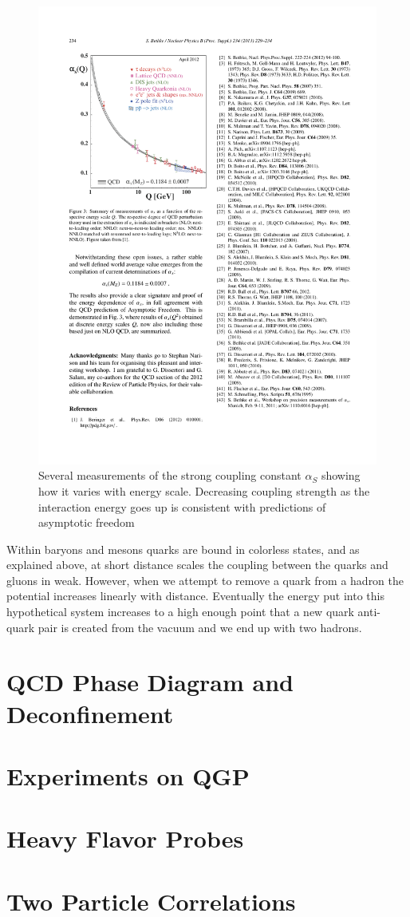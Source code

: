 \begin{figure}[htbp]
\begin{center}
\includegraphics[scale=1.0]{Plots/Intro/asymp_free.pdf}
\end{center}
\caption[Asymptotic Freedom]{Several measurements of the strong coupling constant $\alpha_S$ showing how it varies with energy scale. Decreasing coupling strength as the interaction energy goes up is consistent with predictions of asymptotic freedom}
\label{fig:a_free}
\end{figure}

Within baryons and mesons quarks are bound in colorless states, and as explained above, at short distance scales the coupling between the quarks and gluons in weak. However, when we attempt to remove a quark from a hadron the potential increases linearly with distance. Eventually the energy put into this hypothetical system increases to a high enough point that a new quark anti-quark pair is created from the vacuum and we end up with two hadrons. 

\section{QCD Phase Diagram and Deconfinement}

\section{Experiments on QGP}

\section{Heavy Flavor Probes}

\section{Two Particle Correlations}
